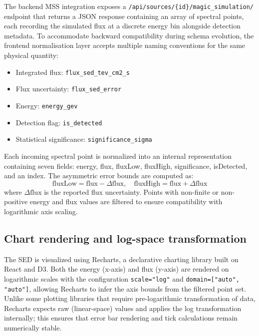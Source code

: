 \documentclass[11pt, a4paper]{article}
\begin{document}
The backend MSS integration exposes a \texttt{/api/sources/\{id\}/magic\_simulation/} endpoint that returns a JSON response containing an array of spectral points, each recording the simulated flux at a discrete energy bin alongside detection metadata.
To accommodate backward compatibility during schema evolution, the frontend normalisation layer accepts multiple naming conventions for the same physical quantity:
\begin{itemize}
    \item Integrated flux: \texttt{flux\_sed\_tev\_cm2\_s}
    \item Flux uncertainty: \texttt{flux\_sed\_error}
    \item Energy: \texttt{energy\_gev}
    \item Detection flag: \texttt{is\_detected}
    \item Statistical significance: \texttt{significance\_sigma}
\end{itemize}

Each incoming spectral point is normalized into an internal representation containing seven fields: energy, flux, fluxLow, fluxHigh, significance, isDetected, and an index. The asymmetric error bounds are computed as:
\begin{equation}
    \mathrm{fluxLow} = \mathrm{flux} - \Delta\mathrm{flux}, \quad \mathrm{fluxHigh} = \mathrm{flux} + \Delta\mathrm{flux}
\end{equation}
where $\Delta\mathrm{flux}$ is the reported flux uncertainty.
Points with non-finite or non-positive energy and flux values are filtered to ensure compatibility with logarithmic axis scaling.

\subsection{Chart rendering and log-space transformation}

The SED is visualized using Recharts, a declarative charting library built on React and D3. Both the energy (x-axis) and flux (y-axis) are rendered on logarithmic scales with the configuration \texttt{scale="log"} and \texttt{domain=["auto", "auto"]}, allowing Recharts to infer the axis bounds from the filtered point set.
Unlike some plotting libraries that require pre-logarithmic transformation of data, Recharts expects raw (linear-space) values and applies the log transformation internally; this ensures that error bar rendering and tick calculations remain numerically stable.
\end{document}
